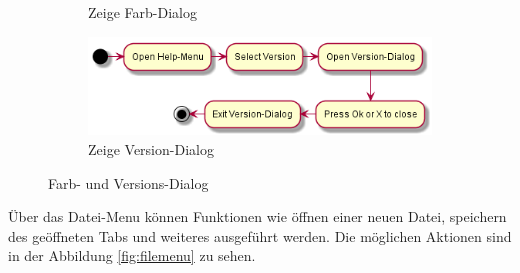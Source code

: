 \begin{figure}[H]
\begin{subfigure}[b]{0.45\linewidth}
        \caption{Zeige Farb-Dialog}
    \end{subfigure}
    \begin{subfigure}[b]{0.45\linewidth}
        \centering
        \includegraphics[width=\linewidth]{figures/version/version.png}
        \caption{Zeige Version-Dialog}
    \end{subfigure}
    \caption{Farb- und Versions-Dialog}
    \label{fig:dialogs}
\end{figure}

\noindent
Über das Datei-Menu können Funktionen wie öffnen einer neuen Datei, speichern des geöffneten Tabs und weiteres 
ausgeführt werden. Die möglichen Aktionen sind in der Abbildung \ref{fig:filemenu} zu sehen.

